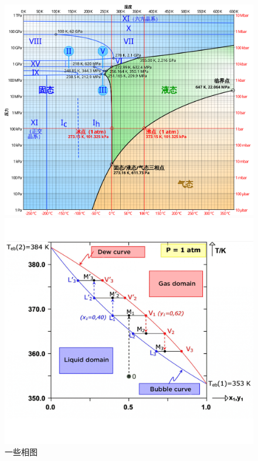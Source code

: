 \documentclass[9pt]{beamer}
\begin{document}
\begin{frame}
	\begin{figure}
	\begin{minipage}{0.48\linewidth}
	\centering
	\vspace{1.4em}
	\includegraphics[scale=0.085]{./pictures/phase_diagram}
	\vspace*{0em}
	\end{minipage}
	\begin{minipage}{0.48\linewidth}
	\centering
	\includegraphics[scale=0.095]{./pictures/redistillation}
	\vspace*{-1.5em}
	\end{minipage}
	\caption{一些相图}
	\end{figure}


\end{frame}
\end{document}
